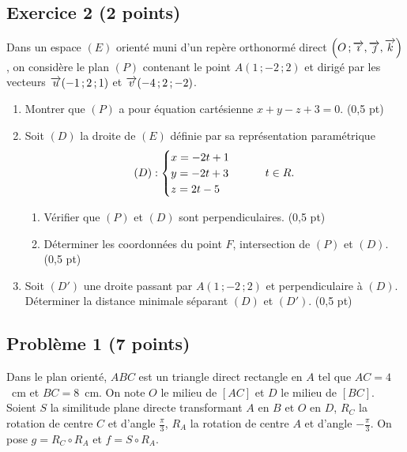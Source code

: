 \subsection*{Exercice 2 \textnormal{(2 points)}}

Dans un espace $(E)$ orienté muni d'un repère orthonormé direct
$\left(O\,;\overrightarrow{\imath},\overrightarrow{\jmath},\overrightarrow{k}\right)$, on considère le plan $(P)$ contenant le
point $A(1\,;-2\,;2)$ et dirigé par les vecteurs $\overrightarrow{u}(-1\,;2\,;1)$ et
$\overrightarrow{v}(-4\,;2\,;-2)$.

\begin{enumerate}[label=\textbf{\arabic*.}, leftmargin=*, itemsep=0.2em]
  \item Montrer que $(P)$ a pour équation cartésienne $x+y-z+3 = 0$.
        \hfill\textup{(0,5 pt)}
  \item Soit $(D)$ la droite de $(E)$ définie par sa représentation
        paramétrique
        \[
          (D) : \begin{cases} x = -2t+1 \\ y = -2t+3 \\ z = 2t-5 \end{cases}
          \qquad t \in R .
        \]
        \begin{enumerate}[label=\textbf{\alph*)}, leftmargin=1.4em]
          \item Vérifier que $(P)$ et $(D)$ sont perpendiculaires.
                \hfill\textup{(0,5 pt)}
          \item Déterminer les coordonnées du point $F$, intersection de
                $(P)$ et $(D)$. \hfill\textup{(0,5 pt)}
        \end{enumerate}
  \item Soit $(D')$ une droite passant par $A(1\,;-2\,;2)$ et perpendiculaire
        à $(D)$. Déterminer la distance minimale séparant $(D)$ et $(D')$.
        \hfill\textup{(0,5 pt)}
\end{enumerate}

\subsection*{Problème 1 \textnormal{(7 points)}}

Dans le plan orienté, $ABC$ est un triangle direct rectangle en $A$ tel que
$AC = 4$~cm et $BC = 8$~cm. On note $O$ le milieu de $[AC]$ et $D$ le milieu
de $[BC]$. Soient $S$ la similitude plane directe transformant $A$ en $B$ et
$O$ en $D$, $R_{C}$ la rotation de centre $C$ et d'angle $\frac{\pi}{3}$,
$R_{A}$ la rotation de centre $A$ et d'angle $-\frac{\pi}{3}$. On pose
$g = R_{C} \circ R_{A}$ et $f = S \circ R_{A}$.

